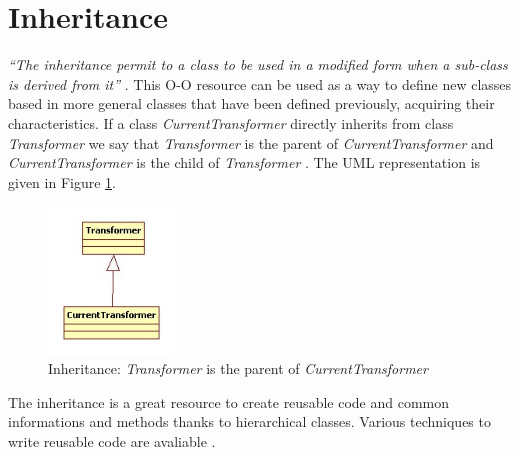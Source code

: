 \section{Inheritance}
 
\emph{
	``The inheritance permit to a class to be 
	used in a modified form when a sub-class 
	is derived from it''
} \cite{Capretz:2003}. This O-O resource 
can be used as a way to define new
classes based in more general classes 
that have been 
defined previously, acquiring their characteristics.  
If a class \emph{CurrentTransformer} directly 
inherits from class \emph{Transformer} we say that 
\emph{Transformer} is the parent 
of \emph{CurrentTransformer} and 
\emph{CurrentTransformer} is the 
child of \emph{Transformer} \cite{Snyder:1986}. 
The UML representation is given in 
Figure \ref{fig:inheritance-fig}.

\begin{figure}
  \includegraphics[width=0.3\textwidth]{chapters/ch-oop/figures/inheritance}
  \caption{
  		Inheritance: \emph{Transformer} is the parent 
		of \emph{CurrentTransformer}
		}
  \label{fig:inheritance-fig}
\end{figure}

The inheritance is a great resource to create 
reusable code and common informations and methods 
thanks to hierarchical classes. 
Various techniques to write reusable code are 
avaliable 
\cite{Johnson:1988} 
\cite{Micallef:1988}
\cite{Gossain:1990} 
\cite{Capretz:1992}.  
